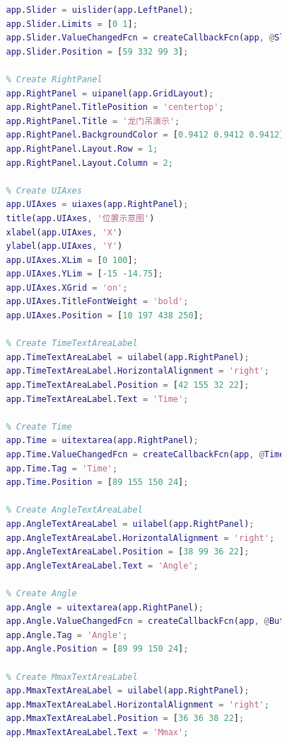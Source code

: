 \documentclass[withoutpreface,bwprint]{cumcmthesis} %
\begin{document}
\begin{appendices}
\begin{lstlisting}[language=matlab]
                % Create Slider
                app.Slider = uislider(app.LeftPanel);
                app.Slider.Limits = [0 1];
                app.Slider.ValueChangedFcn = createCallbackFcn(app, @SliderValueChanged, true);
                app.Slider.Position = [59 332 99 3];
    
                % Create RightPanel
                app.RightPanel = uipanel(app.GridLayout);
                app.RightPanel.TitlePosition = 'centertop';
                app.RightPanel.Title = '龙门吊演示';
                app.RightPanel.BackgroundColor = [0.9412 0.9412 0.9412];
                app.RightPanel.Layout.Row = 1;
                app.RightPanel.Layout.Column = 2;
    
                % Create UIAxes
                app.UIAxes = uiaxes(app.RightPanel);
                title(app.UIAxes, '位置示意图')
                xlabel(app.UIAxes, 'X')
                ylabel(app.UIAxes, 'Y')
                app.UIAxes.XLim = [0 100];
                app.UIAxes.YLim = [-15 -14.75];
                app.UIAxes.XGrid = 'on';
                app.UIAxes.TitleFontWeight = 'bold';
                app.UIAxes.Position = [10 197 438 250];
    
                % Create TimeTextAreaLabel
                app.TimeTextAreaLabel = uilabel(app.RightPanel);
                app.TimeTextAreaLabel.HorizontalAlignment = 'right';
                app.TimeTextAreaLabel.Position = [42 155 32 22];
                app.TimeTextAreaLabel.Text = 'Time';
    
                % Create Time
                app.Time = uitextarea(app.RightPanel);
                app.Time.ValueChangedFcn = createCallbackFcn(app, @TimeValueChanged, true);
                app.Time.Tag = 'Time';
                app.Time.Position = [89 155 150 24];
    
                % Create AngleTextAreaLabel
                app.AngleTextAreaLabel = uilabel(app.RightPanel);
                app.AngleTextAreaLabel.HorizontalAlignment = 'right';
                app.AngleTextAreaLabel.Position = [38 99 36 22];
                app.AngleTextAreaLabel.Text = 'Angle';
    
                % Create Angle
                app.Angle = uitextarea(app.RightPanel);
                app.Angle.ValueChangedFcn = createCallbackFcn(app, @ButtonPushed, true);
                app.Angle.Tag = 'Angle';
                app.Angle.Position = [89 99 150 24];
    
                % Create MmaxTextAreaLabel
                app.MmaxTextAreaLabel = uilabel(app.RightPanel);
                app.MmaxTextAreaLabel.HorizontalAlignment = 'right';
                app.MmaxTextAreaLabel.Position = [36 36 38 22];
                app.MmaxTextAreaLabel.Text = 'Mmax';
    

\end{lstlisting}
\end{appendices}
\end{document}
